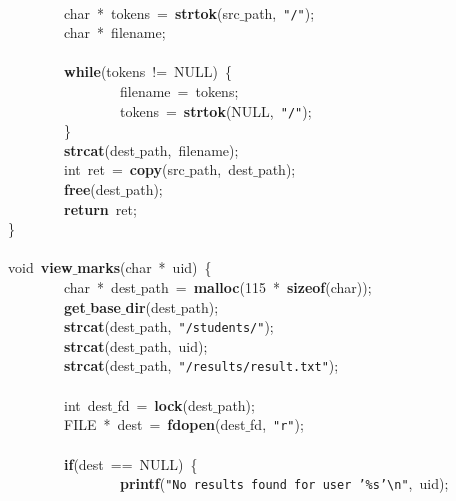 \mbox{} \\
\mbox{}\ \ \ \ \ \ \ \ char\ *\ tokens\ =\ \textbf{strtok}(src$\_$path,\ \texttt{"{}/"{}}); \\
\mbox{}\ \ \ \ \ \ \ \ char\ *\ filename; \\
\mbox{} \\
\mbox{}\ \ \ \ \ \ \ \ \textbf{while}(tokens\ !=\ NULL)\ \{ \\
\mbox{}\ \ \ \ \ \ \ \ \ \ \ \ \ \ \ \ filename\ =\ tokens; \\
\mbox{}\ \ \ \ \ \ \ \ \ \ \ \ \ \ \ \ tokens\ =\ \textbf{strtok}(NULL,\ \texttt{"{}/"{}}); \\
\mbox{}\ \ \ \ \ \ \ \ \} \\
\mbox{}\ \ \ \ \ \ \ \ \textbf{strcat}(dest$\_$path,\ filename); \\
\mbox{}\ \ \ \ \ \ \ \ int\ ret\ =\ \textbf{copy}(src$\_$path,\ dest$\_$path); \\
\mbox{}\ \ \ \ \ \ \ \ \textbf{free}(dest$\_$path); \\
\mbox{}\ \ \ \ \ \ \ \ \textbf{return}\ ret; \\
\mbox{}\} \\
\mbox{} \\
\mbox{}void\ \textbf{view$\_$marks}(char\ *\ uid)\ \{ \\
\mbox{}\ \ \ \ \ \ \ \ char\ *\ dest$\_$path\ =\ \textbf{malloc}(115\ *\ \textbf{sizeof}(char)); \\
\mbox{}\ \ \ \ \ \ \ \ \textbf{get$\_$base$\_$dir}(dest$\_$path); \\
\mbox{}\ \ \ \ \ \ \ \ \textbf{strcat}(dest$\_$path,\ \texttt{"{}/students/"{}}); \\
\mbox{}\ \ \ \ \ \ \ \ \textbf{strcat}(dest$\_$path,\ uid); \\
\mbox{}\ \ \ \ \ \ \ \ \textbf{strcat}(dest$\_$path,\ \texttt{"{}/results/result.txt"{}}); \\
\mbox{} \\
\mbox{}\ \ \ \ \ \ \ \ int\ dest$\_$fd\ =\ \textbf{lock}(dest$\_$path); \\
\mbox{}\ \ \ \ \ \ \ \ FILE\ *\ dest\ =\ \textbf{fdopen}(dest$\_$fd,\ \texttt{"{}r"{}}); \\
\mbox{}\ \ \ \ \ \ \ \  \\
\mbox{}\ \ \ \ \ \ \ \ \textbf{if}(dest\ ==\ NULL)\ \{ \\
\mbox{}\ \ \ \ \ \ \ \ \ \ \ \ \ \ \ \ \textbf{printf}(\texttt{"{}No\ results\ found\ for\ user\ '\%s'}\texttt{\textbackslash{}n}\texttt{"{}},\ uid); \\
